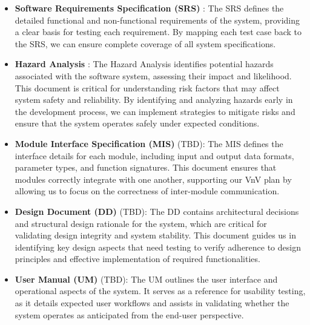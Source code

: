 \documentclass[12pt, titlepage]{article}
\begin{document}
\begin{itemize}
    \item \textbf{Software Requirements Specification (SRS)} \citep{SRS}: The SRS defines the detailed functional and non-functional requirements of the system, providing a clear basis for testing each requirement. By mapping each test case back to the SRS, we can ensure complete coverage of all system specifications. 

    \item \textbf{Hazard Analysis} \citep{Hazard-Analysis}: The Hazard Analysis identifies potential hazards associated with the software system, assessing their impact and likelihood. This document is critical for understanding risk factors that may affect system safety and reliability. By identifying and analyzing hazards early in the development process, we can implement strategies to mitigate risks and ensure that the system operates safely under expected conditions.

    \item \textbf{Module Interface Specification (MIS)} (TBD): The MIS defines the interface details for each module, including input and output data formats, parameter types, and function signatures. This document ensures that modules correctly integrate with one another, supporting our VnV plan by allowing us to focus on the correctness of inter-module communication.

    \item \textbf{Design Document (DD)} (TBD): The DD contains architectural decisions and structural design rationale for the system, which are critical for validating design integrity and system stability. This document guides us in identifying key design aspects that need testing to verify adherence to design principles and effective implementation of required functionalities.

    \item \textbf{User Manual (UM)} (TBD): The UM outlines the user interface and operational aspects of the system. It serves as a reference for usability testing, as it details expected user workflows and assists in validating whether the system operates as anticipated from the end-user perspective.
\end{itemize}

\end{document}
